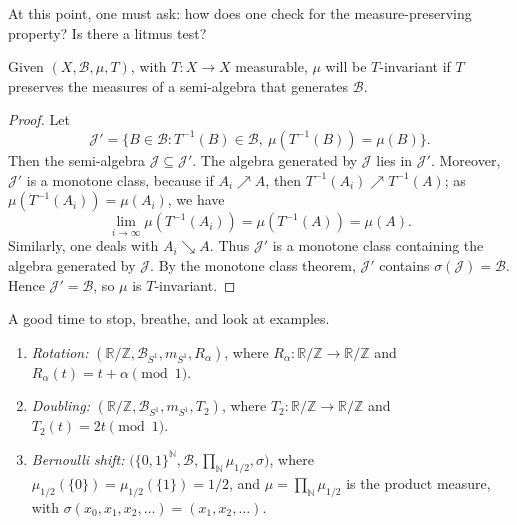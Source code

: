 \documentclass[11pt,a4paper]{article}
\begin{document}
At this point, one must ask: how does one check for the measure-preserving
property? Is there a litmus test?

\setcounter{theorem}{0}\begin{lemma}
Given $(X,\mathcal B,\mu,T)$, with $T\colon X\to X$ measurable, $\mu$ will be
$T$-invariant if $T$ preserves the measures of a semi-algebra that generates
$\mathcal B$.
\end{lemma}
\begin{proof}
Let
\[
  \mathcal J'=\{B\in\mathcal B:T^{-1}(B)\in\mathcal B,
  \ \mu(T^{-1}(B))=\mu(B)\}.
\]
Then the semi-algebra $\mathcal J\subseteq\mathcal J'$. The algebra generated
by $\mathcal J$ lies in $\mathcal J'$. Moreover, $\mathcal J'$ is a monotone
class, because if $A_i\nearrow A$, then $T^{-1}(A_i)\nearrow T^{-1}(A)$;
as $\mu(T^{-1}(A_i))=\mu(A_i)$, we have
\[
  \lim_{i\to\infty}\mu(T^{-1}(A_i))=\mu(T^{-1}(A))=\mu(A).
\]
Similarly, one deals with $A_i\searrow A$. Thus $\mathcal J'$ is a monotone
class containing the algebra generated by $\mathcal J$. By the monotone class
theorem, $\mathcal J'$ contains $\sigma(\mathcal J)=\mathcal B$. Hence
$\mathcal J'=\mathcal B$, so $\mu$ is $T$-invariant.
\end{proof}

A good time to stop, breathe, and look at examples.
\setcounter{example}{0}\begin{example}
\leavevmode\par
\begin{enumerate}
  \setcounter{enumi}{0}\item \emph{Rotation:}
  $(\mathbb R/\mathbb Z,\mathcal B_{S^1},m_{S^1},R_\alpha)$, where
  $R_\alpha\colon\mathbb R/\mathbb Z\to\mathbb R/\mathbb Z$ and
  $R_\alpha(t)=t+\alpha\pmod1$.
  \setcounter{enumi}{1}\item \emph{Doubling:}
  $(\mathbb R/\mathbb Z,\mathcal B_{S^1},m_{S^1},T_2)$, where
  $T_2\colon\mathbb R/\mathbb Z\to\mathbb R/\mathbb Z$ and
  $T_2(t)=2t\pmod1$.
  \setcounter{enumi}{2}\item \emph{Bernoulli shift:}
  $\bigl(\{0,1\}^{\mathbb N},\mathcal B,\prod_{\mathbb N}\mu_{1/2},\sigma\bigr)$,
  where $\mu_{1/2}(\{0\})=\mu_{1/2}(\{1\})=1/2$, and
  $\mu=\prod_{\mathbb N}\mu_{1/2}$ is the product measure, with
  $\sigma(x_0,x_1,x_2,\ldots)=(x_1,x_2,\ldots)$.
\end{enumerate}
\end{example}
\end{document}
